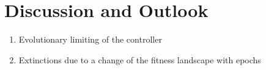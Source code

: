\documentclass[main]{subfiles}
\begin{document}
\setcounter{chapter}{4}

\chapter{Discussion and Outlook} %

\label{Chapter\thechapter} %


\begin{enumerate}
\item Evolutionary limiting of the controller
\item Extinctions due to a change of the fitness landscape with epochs
\end{enumerate}

\end{document}
